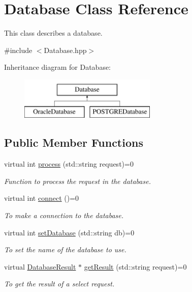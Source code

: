 \hypertarget{classDatabase}{
\section{Database Class Reference}
\label{classDatabase}
}


This class describes a database.  




{\ttfamily \#include $<$Database.hpp$>$}

Inheritance diagram for Database:\begin{figure}[H]
\begin{center}
\leavevmode
\includegraphics[height=2.000000cm]{classDatabase}
\end{center}
\end{figure}
\subsection*{Public Member Functions}
\begin{DoxyCompactItemize}
\item 
virtual int \hyperlink{classDatabase_a41881436b79aac5f4d8e179056564de1}{process} (std::string request)=0
\begin{DoxyCompactList}\small\item\em Function to process the request in the database. \item\end{DoxyCompactList}\item 
virtual int \hyperlink{classDatabase_aed0ada648871f841cfbe08bc1ee1bf92}{connect} ()=0
\begin{DoxyCompactList}\small\item\em To make a connection to the database. \item\end{DoxyCompactList}\item 
virtual int \hyperlink{classDatabase_aeba15395d2a36faf73dcb995695b9204}{setDatabase} (std::string db)=0
\begin{DoxyCompactList}\small\item\em To set the name of the database to use. \item\end{DoxyCompactList}\item 
virtual \hyperlink{classDatabaseResult}{DatabaseResult} $\ast$ \hyperlink{classDatabase_a30f002bf9752a54c2a056abc1b8bb4d4}{getResult} (std::string request)=0
\begin{DoxyCompactList}\small\item\em To get the result of a select request. \item\end{DoxyCompactList}\end{DoxyCompactItemize}
